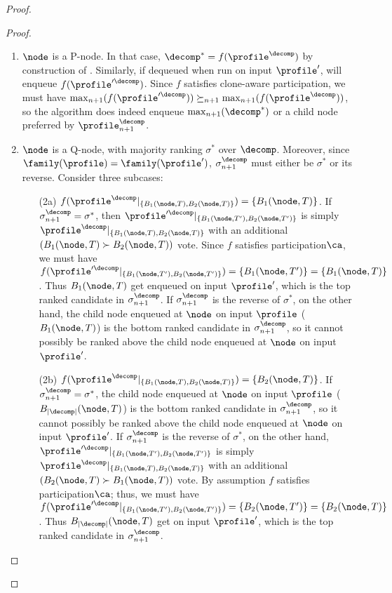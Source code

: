 \begin{proof}
\begin{proof}
    \begin{enumerate}
        \item $\node$ is a P-node. In that case, $\decomp^*=f(\profile^\decomp)$ by construction of . Similarly, if dequeued when run on input $\profile'$,  will enqueue $f(\profile'^\decomp)$. Since $f$ satisfies clone-aware participation, we must have  $\max_{n+1}(f(\profile'^\decomp)) \succeq_{n+1}\max_{n+1}(f(\profile^\decomp))$, so the algorithm does indeed enqueue $\max_{n+1}(\decomp^*)$ or a child node preferred by $\profile^\decomp_{n+1}$. 
        \item $\node$ is a Q-node, with majority ranking $\sigma^*$ over $\decomp$. Moreover, since $\family(\profile)=\family(\profile')$, $\sigma^\decomp_{n+1}$ must either be $\sigma^*$ or its reverse. Consider three subcases:
        \begin{enumerate}
            \item[(2a)] $f(\profile^{\decomp}|_{\{B_1(\node, T), B_2(\node,T)\}})=\{B_1(\node,T)\}$. If $\sigma_{n+1}^\decomp=\sigma^*$, then $\profile'^{\decomp}|_{\{B_1(\node, T'), B_2(\node,T')\}}$ is simply $\profile^{\decomp}|_{\{B_1(\node, T), B_2(\node,T)\}}$ with an additional $(B_1(\node, T) \succ B_2(\node, T))$ vote. Since $f$ satisfies participation$\ca$, we must have $f(\profile'^{\decomp}|_{\{B_1(\node, T'), B_2(\node,T')\}})=\{B_1(\node,T')\}=\{B_1(\node,T)\}$. Thus $B_{1}(\node,T)$ get enqueued on input $\profile'$, which is the top ranked candidate in $\sigma^\decomp_{n+1}$. If $\sigma_{n+1}^\decomp$ is the reverse of $\sigma^*$, on the other hand, the child node enqueued at $\node$ on input $\profile$ ($B_1(\node,T)$) is the bottom ranked candidate in $\sigma_{n+1}^\decomp$, so it cannot possibly be ranked above the child node enqueued at $\node$ on input $\profile'$.
            \item[(2b)] $f(\profile^{\decomp}|_{\{B_1(\node, T), B_2(\node,T)\}})=\{B_2(\node,T)\}$. If $\sigma_{n+1}^\decomp=\sigma^*$, the child node enqueued at $\node$ on input $\profile$ ($B_{|\decomp|}(\node,T)$) is the bottom ranked candidate in $\sigma_{n+1}^\decomp$, so it cannot possibly be ranked above the child node enqueued at $\node$ on input $\profile'$. If $\sigma_{n+1}^\decomp$ is the reverse of $\sigma^*$, on the other hand, $\profile'^{\decomp}|_{\{B_1(\node, T'), B_2(\node,T')\}}$ is simply $\profile^{\decomp}|_{\{B_1(\node, T), B_2(\node,T)\}}$ with an additional $(B_2(\node, T) \succ B_1(\node, T))$ vote. By assumption $f$ satisfies participation$\ca$; thus, we must have $f(\profile'^{\decomp}|_{\{B_1(\node, T'), B_2(\node,T')\}})=\{B_2(\node,T')\}=\{B_2(\node,T)\}$. Thus $B_{|\decomp|}(\node,T)$ get on input $\profile'$, which is the top ranked candidate in $\sigma^\decomp_{n+1}$.

\end{enumerate}
\end{enumerate}
\end{proof}
\end{proof}
